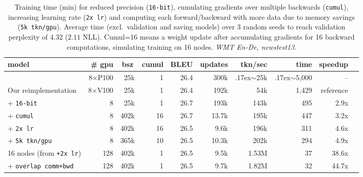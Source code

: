 \documentclass[11pt,a4paper]{article}
\newcommand{\customtilde}{\raise.17ex\hbox{$\scriptstyle\sim$}}
\begin{document}
\begin{table*}
\centering
\begin{tabular}{l | r r r | r r r r r r}
\toprule
model & \# gpu &
\multicolumn{1}{c}{bsz} 
 & {\small cumul} & BLEU & updates & tkn/sec & time & speedup \\
\hline
\citet{vaswani2017transformer} & {\small 8$\times$P100} & 25k  & 1 &  26.4  & 300k & \customtilde 25k & \customtilde 5,000 & --\\
\hline
Our reimplementation & {\small 8$\times$V100} & 25k  & 1 &  26.4  & 192k & 54k & 1,429 & {\small reference}\\
\hline
+ \texttt{16-bit} &8& 25k  & 1 &  26.7  & 193k & 143k & 495 & 2.9x \\
+ \texttt{cumul} &8& 402k  & 16 &  26.7 &  13.7k & 195k & 447 & 3.2x\\
+ \texttt{2x lr}  &8& 402k  & 16  &  26.5 & 9.6k & 196k & 311 & 4.6x \\
+ \texttt{5k tkn/gpu}  &8& 365k & 10 & 26.5 & 10.3k & 202k & 294 & 4.9x \\
\hline
16 nodes (from {\tt +2x\,lr}) & 128 & 402k & 1 & 26.5 & 9.5k & 1.53M & 37 & 38.6x \\
+ \texttt{overlap comm+bwd} & 128 & 402k & 1 & 26.5 & 9.7k & 1.82M & 32 & 44.7x \\
\bottomrule
\end{tabular}
\caption{Training time (min) for reduced precision (\texttt{16-bit}), cumulating gradients over multiple backwards (\texttt{cumul}), increasing learning rate (\texttt{2x lr})
and computing each forward/backward with more data due to memory savings (\texttt{5k tkn/gpu}).
Average time (excl.~validation and saving models) over 3 random seeds to reach validation perplexity of $4.32$ ($2.11$ NLL).
Cumul=16 means a weight update after accumulating gradients for 16 backward computations, simulating training on 16 nodes.
\emph{WMT En-De, newstest13}.
}
\label{tab:speed}
\end{table*}
\end{document}
